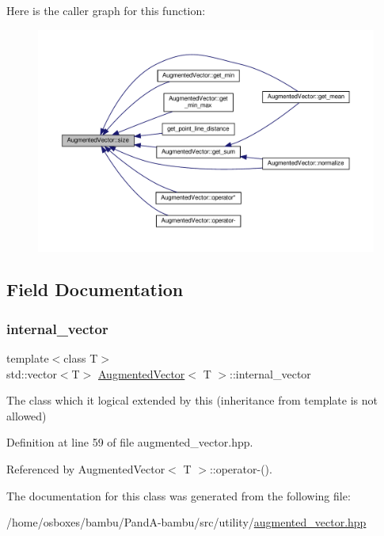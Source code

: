 Here is the caller graph for this function\+:
\nopagebreak
\begin{figure}[H]
\begin{center}
\leavevmode
\includegraphics[width=350pt]{d1/d7a/classAugmentedVector_a8360b512194a0eca26dad07eb60a04d1_icgraph}
\end{center}
\end{figure}


\subsection{Field Documentation}
\mbox{\label{classAugmentedVector_a07678225043fa36bd6718d655c4474d2}} 
\subsubsection{\texorpdfstring{internal\+\_\+vector}{internal\_vector}}
{\footnotesize\ttfamily template$<$class T$>$ \\
std\+::vector$<$T$>$ \hyperlink{classAugmentedVector}{Augmented\+Vector}$<$ T $>$\+::internal\+\_\+vector\hspace{0.3cm}{\ttfamily [private]}}



The class which it logical extended by this (inheritance from template is not allowed) 



Definition at line 59 of file augmented\+\_\+vector.\+hpp.



Referenced by Augmented\+Vector$<$ T $>$\+::operator-\/().



The documentation for this class was generated from the following file\+:\begin{DoxyCompactItemize}
\item 
/home/osboxes/bambu/\+Pand\+A-\/bambu/src/utility/\hyperlink{augmented__vector_8hpp}{augmented\+\_\+vector.\+hpp}\end{DoxyCompactItemize}
